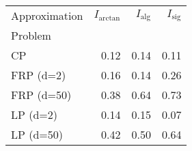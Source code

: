 \begin{tabular}{lrrr}
Approximation & $I_\text{arctan}$ & $I_\text{alg}$ & $I_\text{sig}$ \\
Problem &  &  &  \\
CP & 0.12 & 0.14 & 0.11 \\
\cline{1-4}
FRP (d=2) & 0.16 & 0.14 & 0.26 \\
\cline{1-4}
FRP (d=50) & 0.38 & 0.64 & 0.73 \\
\cline{1-4}
LP (d=2) & 0.14 & 0.15 & 0.07 \\
\cline{1-4}
LP (d=50) & 0.42 & 0.50 & 0.64 \\
\cline{1-4}
\end{tabular}

